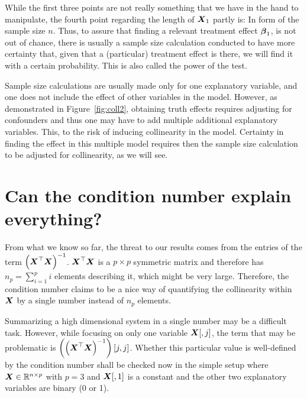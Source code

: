\documentclass[11pt,a4paper,twoside]{book}\usepackage[]{graphicx}\usepackage[]{xcolor}
\begin{document}
While the first three points are not really something that we have in the hand to manipulate, the fourth point regarding the length of ${\boldsymbol{X}}_1$ partly is: In form of the sample size $n$. Thus, to assure that finding a relevant treatment effect ${\boldsymbol{\beta}}_1$, is not out of chance, there is usually a sample size calculation conducted to have more certainty that, given that a (particular) treatment effect is there, we will find it with a certain probability. This is also called the power of the test. 

Sample size calculations are usually made only for one explanatory variable, and one does not include the effect of other variables in the model. However, as demonstrated in Figure~\ref{fig:coll2}, obtaining truth effects requires adjusting for confounders and thus one may have to add multiple additional explanatory variables. This, to the risk of inducing collinearity in the model. Certainty in finding the effect in this multiple model requires then the sample size calculation to be adjusted for collinearity, as we will see. 


\section{Can the condition number explain everything?}

From what we know so far, the threat to our results comes from the entries of the term $\left({\boldsymbol{X}}^\top{\boldsymbol{X}}\right)^{-1}$. ${\boldsymbol{X}}^\top{\boldsymbol{X}}$ is a $p\times p$ symmetric matrix and therefore has $n_p=\sum_{i=1}^{p}i$ elements describing it, which might be very large. Therefore, the condition number claims to be a nice way of quantifying the collinearity within ${\boldsymbol{X}}$ by a single number instead of $n_p$ elements.

Summarizing a high dimensional system in a single number may be a difficult task. However, while focusing on only one variable ${\boldsymbol{X}}[,j]$, the term that may be problematic is $\left(\left({\boldsymbol{X}}^\top{\boldsymbol{X}}\right)^{-1}\right)[j,j]$. Whether this particular value is well-defined by the condition number shall be checked now in the simple setup where ${\boldsymbol{X}}\in{\mathbb{R}}^{n\times p}$ with $p=3$ and ${\boldsymbol{X}}[,1]$ is a constant and the other two explanatory variables are binary (0 or 1).
\end{document}
